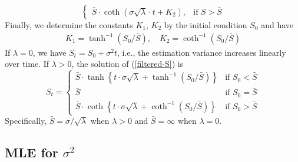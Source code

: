\documentclass[mnsc]{informs3}
\begin{document}
\begin{APPENDICES}
\begin{equation*}
\begin{cases}
		\bar{S}\cdot\coth(\sigma\sqrt{\lambda}\cdot t + K_2), & \text{if } S>\bar{S}
	\end{cases}
\end{equation*}
Finally, we determine the constants $K_1$, $K_2$ by the initial condition $S_0$ and have
\begin{align*}
	K_1 = \tanh^{-1}(S_0/\bar{S}),\quad
	K_2 = \coth^{-1}(S_0/\bar{S})
\end{align*}
If $\lambda = 0$, we have $S_t = S_0+\sigma^2t$, i.e., the estimation variance increases linearly over time.
If $\lambda > 0$, the solution of (\ref{filtered-S}) is
\begin{equation*}
	S_t =
	\begin{cases}
        \bar{S} \cdot \tanh\left\{t\cdot\sigma\sqrt{\lambda} +  \tanh^{-1}\left(S_0\big/\bar{S}\right)\right\} & \text{if } S_0 < \bar{S} \\
        \bar{S} & \text{if } S_0 = \bar{S} \\
        \bar{S} \cdot \coth\left\{t\cdot\sigma\sqrt{\lambda} +  \coth^{-1}\left(S_0\big/\bar{S}\right)\right\} & \text{if } S_0 > \bar{S}
	\end{cases}
\end{equation*}
Specifically, $\bar{S} = \sigma / \sqrt{\lambda}$ when $\lambda>0$ and $\bar{S} = \infty$ when $\lambda = 0$.


\subsection{MLE for $\sigma^2$}\label{appexidx-normal-MLE}


\end{APPENDICES}
\end{document}

